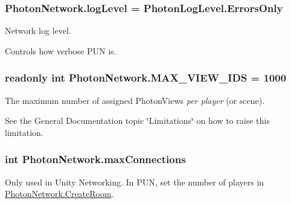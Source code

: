 \subsubsection[{\texorpdfstring{log\+Level}{logLevel}}]{ Photon\+Network.\+log\+Level = {\bf Photon\+Log\+Level.\+Errors\+Only}\hspace{0.3cm}{\ttfamily [static]}}\hypertarget{class_photon_network_aa7c0c32ec0a25f37438436f10c5bde59}{}\label{class_photon_network_aa7c0c32ec0a25f37438436f10c5bde59}


Network log level. 

Controls how verbose P\+UN is. 
\subsubsection[{\texorpdfstring{M\+A\+X\+\_\+\+V\+I\+E\+W\+\_\+\+I\+DS}{MAX_VIEW_IDS}}]{\setlength{\rightskip}{0pt plus 5cm}readonly int Photon\+Network.\+M\+A\+X\+\_\+\+V\+I\+E\+W\+\_\+\+I\+DS = 1000\hspace{0.3cm}{\ttfamily [static]}}\hypertarget{class_photon_network_ad3b82aa2ac8d89db5ebf0bc5ac9add9e}{}\label{class_photon_network_ad3b82aa2ac8d89db5ebf0bc5ac9add9e}


The maximum number of assigned Photon\+Views {\itshape per player} (or scene). 

See the General Documentation topic \char`\"{}\+Limitations\char`\"{} on how to raise this limitation. 
\subsubsection[{\texorpdfstring{max\+Connections}{maxConnections}}]{\setlength{\rightskip}{0pt plus 5cm}int Photon\+Network.\+max\+Connections\hspace{0.3cm}{\ttfamily [static]}}\hypertarget{class_photon_network_a7a74751daa6e6e979cff9ba3aceb56dd}{}\label{class_photon_network_a7a74751daa6e6e979cff9ba3aceb56dd}


Only used in Unity Networking. In P\+UN, set the number of players in \hyperlink{class_photon_network_a5ab80136622c2ae46b0e4f766e489d74}{Photon\+Network.\+Create\+Room}.

